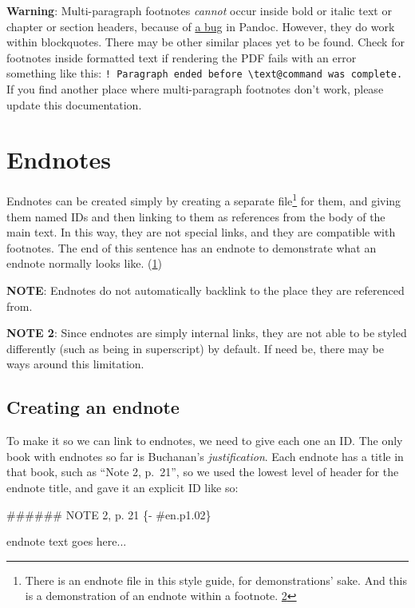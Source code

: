 \documentclass[
]{book}
\newenvironment{Shaded}{\begin{snugshade}}{\end{snugshade}}
\newcommand{\FunctionTok}[1]{\textcolor[rgb]{0.00,0.00,0.00}{#1}}
\newcommand{\NormalTok}[1]{#1}
\begin{document}
\textbf{Warning}: Multi-paragraph footnotes \emph{cannot} occur inside bold or italic text or chapter or section headers, because of \href{https://github.com/jgm/pandoc/issues/6733}{a bug} in Pandoc. However, they do work within blockquotes. There may be other similar places yet to be found. Check for footnotes inside formatted text if rendering the PDF fails with an error something like this: \texttt{!\ Paragraph\ ended\ before\ \textbackslash{}text@command\ was\ complete.} If you find another place where multi-paragraph footnotes don't work, please update this documentation.

\hypertarget{endnotes}{%
\section{Endnotes}\label{endnotes}}

Endnotes can be created simply by creating a separate file\footnote{There is an endnote file in this style guide, for demonstrations' sake. And this is a demonstration of an endnote within a footnote. \protect\hyperlink{en.02}{2}} for them, and giving them named IDs and then linking to them as references from the body of the main text. In this way, they are not special links, and they are compatible with footnotes. The end of this sentence has an endnote to demonstrate what an endnote normally looks like. (\protect\hyperlink{en.01}{1})

\textbf{NOTE}: Endnotes do not automatically backlink to the place they are referenced from.

\textbf{NOTE 2}: Since endnotes are simply internal links, they are not able to be styled differently (such as being in superscript) by default. If need be, there may be ways around this limitation.

\hypertarget{creating-an-endnote}{%
\subsection{Creating an endnote}\label{creating-an-endnote}}

To make it so we can link to endnotes, we need to give each one an ID. The only book with endnotes so far is Buchanan's \emph{justification}. Each endnote has a title in that book, such as ``Note 2, p.~21'', so we used the lowest level of header for the endnote title, and gave it an explicit ID like so:

\begin{Shaded}
\begin{Highlighting}[]
\FunctionTok{\#\#\#\#\#\# NOTE 2, p. 21  \{{-} \#en.p1.02\}}

\NormalTok{endnote text goes here...}
\end{Highlighting}
\end{Shaded}
\end{document}

